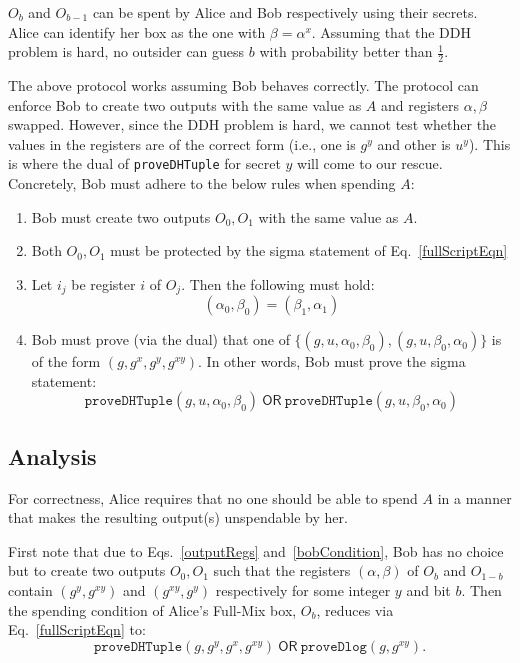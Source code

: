 \documentclass[runningheads]{llncs}
\newcommand{\ornode}{\ensuremath{\mathsf{OR}}}
\begin{document}
$O_b$ and $O_{b-1}$ can be spent by Alice and Bob respectively using their secrets. Alice can identify her box as the one with ${\beta} = {\alpha}^x$. 
Assuming that the DDH problem is hard, no outsider can guess $b$ with probability better than $\frac{1}{2}$. 

The above protocol works assuming Bob behaves correctly. The protocol can enforce Bob to create two outputs with the same value as $A$ and registers $\alpha, \beta$ swapped.
However, since the DDH problem is hard, we cannot test whether the values in the registers are of the correct form (i.e., one is $g^y$ and other is $u^y$).
This is where the dual of \texttt{proveDHTuple} for secret $y$ will come to our rescue. 
Concretely, Bob must adhere to the below rules when spending $A$:
	\begin{enumerate}
		\item Bob must create two outputs $O_0, O_1$ with the same value as $A$. 
		\item Both $O_0, O_1$ must be protected by the sigma statement of Eq.~\ref{fullScriptEqn}
        \item Let $i_j$ be register $i$ of $O_j$. Then the following must hold: 
            \begin{equation}\label{outputRegs}
    		({\alpha}_0, {\beta}_0) = ( {\beta}_1, {\alpha}_1)
            \end{equation}
		\item Bob must prove (via the dual) that one of $\{(g, u, {\alpha}_0, {\beta}_0), (g, u, {\beta}_0, {\alpha}_0)\}$ is of the form $(g, g^x, g^y, g^{xy})$. In other words, Bob must prove the sigma statement: 
    		\begin{equation}\label{bobCondition}
    		\texttt{proveDHTuple}(g, u, {\alpha}_0, {\beta}_0)~\ornode~\texttt{proveDHTuple}(g, u, {\beta}_0, {\alpha}_0)
    		\end{equation}
	\end{enumerate}
\subsection{Analysis}

For correctness, Alice requires that no one should be able to spend $A$ in a manner that makes the resulting output(s) unspendable by her.

First note that due to Eqs.~\ref{outputRegs} and~\ref{bobCondition}, Bob has no choice but to create two outputs $O_0, O_1$ such that the registers $({\alpha}, {\beta})$ of $O_b$ and $O_{1-b}$ contain $(g^y, g^{xy})$ and $(g^{xy}, g^y)$ respectively for some integer $y$ and bit $b$. Then the spending condition of Alice's Full-Mix box, $O_b$, reduces via Eq.~\ref{fullScriptEqn} to:
$$\texttt{proveDHTuple}(g, g^{y}, g^x, g^{xy}) ~\ornode~ \texttt{proveDlog}(g, g^{xy}).$$ 
\end{document}
